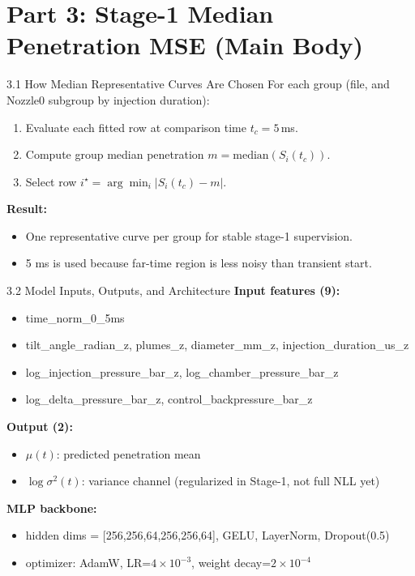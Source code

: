 \documentclass[UTF8,aspectratio=169]{ctexbeamer}
\begin{document}
\section{Part 3: Stage-1 Median Penetration MSE (Main Body)}

\begin{frame}{3.1 How Median Representative Curves Are Chosen}
For each group (file, and Nozzle0 subgroup by injection duration):
\begin{enumerate}
  \item Evaluate each fitted row at comparison time $t_c=5\,$ms.
  \item Compute group median penetration $m=\mathrm{median}(S_i(t_c))$.
  \item Select row $i^\star = \arg\min_i |S_i(t_c)-m|$.
\end{enumerate}

\vspace{0.3em}
\textbf{Result:}
\begin{itemize}
  \item One representative curve per group for stable stage-1 supervision.
  \item 5 ms is used because far-time region is less noisy than transient start.
\end{itemize}
\end{frame}

\begin{frame}{3.2 Model Inputs, Outputs, and Architecture}
\textbf{Input features (9):}
\begin{itemize}
  \item time\_norm\_0\_5ms
  \item tilt\_angle\_radian\_z, plumes\_z, diameter\_mm\_z, injection\_duration\_us\_z
  \item log\_injection\_pressure\_bar\_z, log\_chamber\_pressure\_bar\_z
  \item log\_delta\_pressure\_bar\_z, control\_backpressure\_bar\_z
\end{itemize}

\vspace{0.3em}
\textbf{Output (2):}
\begin{itemize}
  \item $\mu(t)$: predicted penetration mean
  \item $\log \sigma^2(t)$: variance channel (regularized in Stage-1, not full NLL yet)
\end{itemize}

\vspace{0.3em}
\textbf{MLP backbone:}
\begin{itemize}
  \item hidden dims = [256,256,64,256,256,64], GELU, LayerNorm, Dropout(0.5)
  \item optimizer: AdamW, LR=$4\times 10^{-3}$, weight decay=$2\times 10^{-4}$
\end{itemize}
\end{frame}
\end{document}
